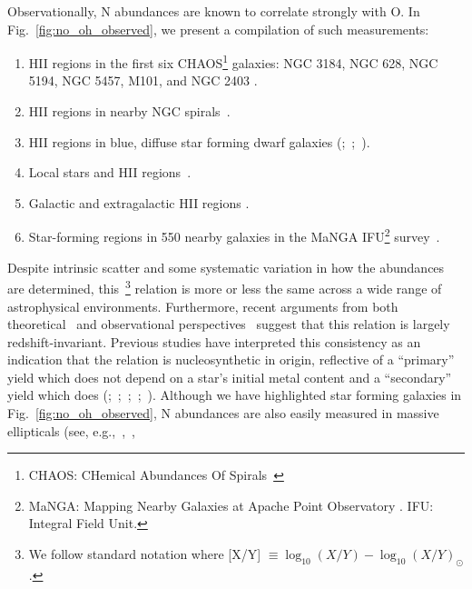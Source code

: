 \documentclass[ms.tex]{subfiles}
\begin{document}
Observationally, N abundances are known to correlate strongly with O.
In Fig.~\ref{fig:no_oh_observed}, we present a compilation of such measurements:
\begin{enumerate}
	\item[\textbf{1.}] HII regions in the first six CHAOS\footnote{
		CHAOS: CHemical Abundances Of Spirals~\citep{Berg2015}
	} galaxies: NGC 3184, NGC 628, NGC 5194, NGC 5457, M101, and NGC 2403
	\citep{Berg2020, Skillman2020, Rogers2021}.

	\item[\textbf{2.}] HII regions in nearby NGC spirals~\citep*{Pilyugin2010}.

	\item[\textbf{3.}] HII regions in blue, diffuse star forming dwarf galaxies
	(\citealp{Berg2012};~\citealp*{Izotov2012};~\citealp{James2015}).

	\item[\textbf{4.}] Local stars and HII regions~\citep{Dopita2016}.

	\item[\textbf{5.}] Galactic and extragalactic HII regions
	\citep*{Henry2000}.

	\item[\textbf{6.}] Star-forming regions in 550  nearby galaxies in the
	MaNGA IFU\footnote{
		MaNGA: Mapping Nearby Galaxies at Apache Point Observatory
		\citep{Bundy2015}.
		IFU: Integral Field Unit.
	} survey~\citep{Belfiore2017}.
\end{enumerate}
Despite intrinsic scatter and some systematic variation in how the abundances
are determined, this~\ohno\footnote{
	We follow standard notation where [X/Y]
	$\equiv \log_{10}(X/Y) - \log_{10}(X/Y)_\odot$.
} relation is more or less the same across a wide range of astrophysical
environments.
Furthermore, recent arguments from both theoretical~\citep{Vincenzo2018} and
observational perspectives~\citep{HaydenPawson2021} suggest that this relation
is largely redshift-invariant.
Previous studies have interpreted this consistency as an indication that the
relation is nucleosynthetic in origin, reflective of a ``primary'' yield which
does not depend on a star's initial metal content and a ``secondary'' yield
which does (\citealp{VilaCostas1993};~\citealp*{vanZee1998};~\citealp{Henry1999,
PerezMontero2009};~\citealp*{Pilyugin2012};~\citealp{Andrews2013}).
Although we have highlighted star forming galaxies in
Fig.~\ref{fig:no_oh_observed}, N abundances are also easily measured in
massive ellipticals (see, e.g.,~\citealp{Schiavon2010},~\citealp{Conroy2013},
\end{document}
